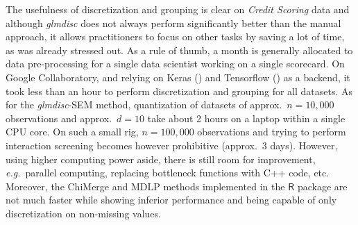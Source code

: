 The usefulness of discretization and grouping is clear on \textit{Credit Scoring} data and although \textit{glmdisc} does not always perform significantly better than the manual approach, it allows practitioners to focus on other tasks by saving a lot of time, as was already stressed out. As a rule of thumb, a month is generally allocated to data pre-processing for a single data scientist working on a single scorecard. On Google Collaboratory, and relying on Keras (\cite{chollet2015keras}) and Tensorflow (\cite{tensorflow2015-whitepaper}) as a backend, it took less than an hour to perform discretization and grouping for all datasets. As for the \textit{glmdisc}-SEM method, quantization of datasets of approx.\ $n = 10{,}000$ observations and approx.\ $d = 10$ take about 2 hours on a laptop within a single CPU core. On such a small rig, $n = 100{,}000$ observations and trying to perform interaction screening becomes however prohibitive (approx.\ 3 days). However, using higher computing power aside, there is still room for improvement, \textit{e.g.}\ parallel computing, replacing bottleneck functions with C++ code, etc. Moreover, the ChiMerge and MDLP methods implemented in the $\textsf{R}$ package  are not much faster while showing inferior performance and being capable of only discretization on non-missing values.



